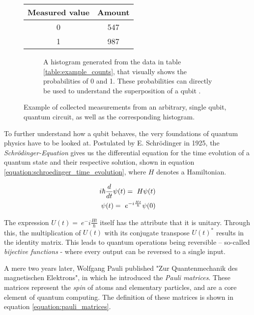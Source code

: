 \begin{figure}[!h]
    \begin{subtable}{.5\textwidth}
    \centering
    \begin{tabular}{|c|c|}
         Measured value & Amount  \\
         \hline
         0 & 547 \\
         1 & 987 \\
    \end{tabular}
    \caption{Table containing all measurements done on a qubit in an unknown superposition. The number of occurrences of a measured 1 or 0 is counted and then used to generate the histogram in figure \ref{figure:example_histogram}}
    \label{table:example_counts}
    \end{subtable}
    \begin{subfigure}{.5\textwidth}
        \centering
        \scalebox{\histogramwidth}{
            
        }
        \caption{A histogram generated from the data in table \ref{table:example_counts}, that visually shows the probabilities of 0 and 1. These probabilities can directly be used to understand the superposition of a qubit .}
        \label{figure:example_histogram}
    \end{subfigure}
    \caption{Example of collected measurements from an arbitrary, single qubit, quantum circuit, as well as the corresponding histogram.}
    \label{fig:my_label}
\end{figure}

\newpage

To further understand how a qubit behaves, the very foundations of quantum physics have to be looked at. Postulated by E. Schrödinger in 1925, the \emph{Schrödinger-Equation}\cite{PhysRev.28.1049} gives us the differential equation for the time evolution of a quantum state and their respective solution, shown in equation \ref{equation:schroedinger_time_evolution}, where $H$ denotes a Hamiltonian.

\begin{equation}
    \centering
    \begin{split}
          i\hbar\frac{d}{dt}\psi(t) =\ H\psi(t) \\
        \psi(t) =\ e^{-i\frac{Ht}{\hbar}}\psi(0)
    \end{split}
    \label{equation:schroedinger_time_evolution}
\end{equation}

The expression $U(t) =\ e^-i\frac{Ht}{\hbar}$ itself has the attribute that it is unitary. Through this, the multiplication of $U(t)$ with its conjugate transpose $U(t)^\ast$ results in the identity matrix. This leads to quantum operations being reversible – so-called \emph{bijective functions} - where every output can be reversed to a single input. \par
A mere two years later, Wolfgang Pauli published "Zur Quantenmechanik des magnetischen Elektrons"\cite{pauli_zur_1927}, in which he introduced the \emph{Pauli matrices}. These matrices represent the \emph{spin} of atoms and elementary particles, and are a core element of quantum computing. The definition of these matrices is shown in equation \ref{equation:pauli_matrices}.

